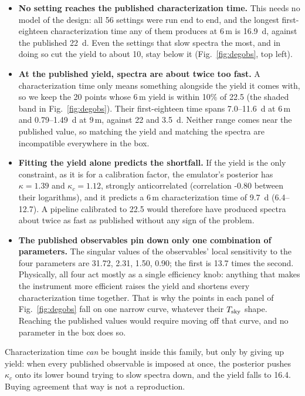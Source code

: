 \documentclass[11pt,a4paper]{article}
\begin{document}
\begin{itemize}
\item \textbf{No setting reaches the published characterization time.} This needs no model of the
  design: all 56 settings were run end to end, and the longest first-eighteen
  characterization time any of them produces at $6\,$m is 16.9~d, against the
  published 22~d. Even the settings that slow spectra the most, and in doing so cut the yield to
  about 10, stay below it (Fig.~\ref{fig:degobs}, top left).
\item \textbf{At the published yield, spectra are about twice too fast.} A characterization time
  only means something alongside the yield it comes with, so we keep the 20 points whose
  $6\,$m yield is within 10\% of 22.5 (the shaded band in Fig.~\ref{fig:degobs}). Their
  first-eighteen time spans 7.0--11.6~d at $6\,$m and
  0.79--1.49~d at $9\,$m, against 22 and 3.5~d. Neither range
  comes near the published value, so matching the yield and matching the spectra are incompatible
  everywhere in the box.
\item \textbf{Fitting the yield alone predicts the shortfall.} If the yield is the only constraint,
  as it is for a calibration factor, the emulator's posterior has $\kappa = 1.39$ and
  $\kappa_c = 1.12$, strongly anticorrelated (correlation -0.80 between their
  logarithms), and it predicts a $6\,$m characterization time of 9.7~d
  (6.4--12.7). A pipeline calibrated to 22.5 would therefore have produced
  spectra about twice as fast as published without any sign of the problem.
\item \textbf{The published observables pin down only one combination of parameters.} The
  singular values of the observables' local sensitivity to the four parameters are 31.72, 2.31, 1.50, 0.90;
  the first is 13.7 times the second. Physically, all four act mostly as a single
  efficiency knob: anything that makes the instrument more efficient raises the yield and shortens
  every characterization time together. That is why the points in each panel of
  Fig.~\ref{fig:degobs} fall on one narrow curve, whatever their $T_{\rm sky}$ shape. Reaching the
  published values would require moving off that curve, and no parameter in the box does so.
\end{itemize}

Characterization time \emph{can} be bought inside this family, but only by giving up yield: when
every published observable is imposed at once, the posterior pushes $\kappa_c$ onto its lower
bound trying to slow spectra down, and the yield falls to 16.4. Buying agreement that way is not a
reproduction.
\end{document}
